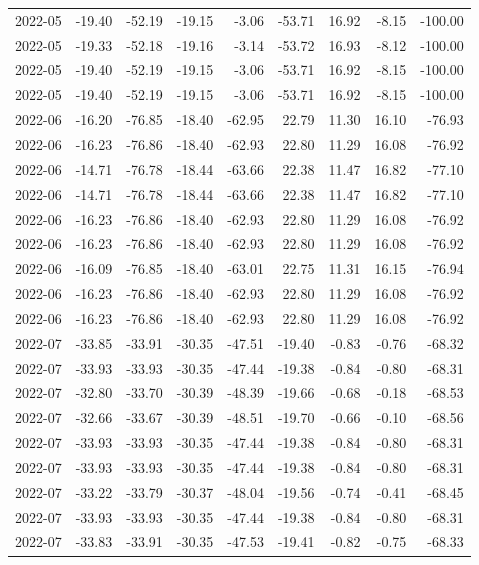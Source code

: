 \begin{table}[ht]
\begin{tabular}{lrrrrrrrr}
  2022-05 & -19.40 & -52.19 & -19.15 & -3.06 & -53.71 & 16.92 & -8.15 & -100.00 \\ 
  2022-05 & -19.33 & -52.18 & -19.16 & -3.14 & -53.72 & 16.93 & -8.12 & -100.00 \\ 
  2022-05 & -19.40 & -52.19 & -19.15 & -3.06 & -53.71 & 16.92 & -8.15 & -100.00 \\ 
  2022-05 & -19.40 & -52.19 & -19.15 & -3.06 & -53.71 & 16.92 & -8.15 & -100.00 \\ 
  2022-06 & -16.20 & -76.85 & -18.40 & -62.95 & 22.79 & 11.30 & 16.10 & -76.93 \\ 
  2022-06 & -16.23 & -76.86 & -18.40 & -62.93 & 22.80 & 11.29 & 16.08 & -76.92 \\ 
  2022-06 & -14.71 & -76.78 & -18.44 & -63.66 & 22.38 & 11.47 & 16.82 & -77.10 \\ 
  2022-06 & -14.71 & -76.78 & -18.44 & -63.66 & 22.38 & 11.47 & 16.82 & -77.10 \\ 
  2022-06 & -16.23 & -76.86 & -18.40 & -62.93 & 22.80 & 11.29 & 16.08 & -76.92 \\ 
  2022-06 & -16.23 & -76.86 & -18.40 & -62.93 & 22.80 & 11.29 & 16.08 & -76.92 \\ 
  2022-06 & -16.09 & -76.85 & -18.40 & -63.01 & 22.75 & 11.31 & 16.15 & -76.94 \\ 
  2022-06 & -16.23 & -76.86 & -18.40 & -62.93 & 22.80 & 11.29 & 16.08 & -76.92 \\ 
  2022-06 & -16.23 & -76.86 & -18.40 & -62.93 & 22.80 & 11.29 & 16.08 & -76.92 \\ 
  2022-07 & -33.85 & -33.91 & -30.35 & -47.51 & -19.40 & -0.83 & -0.76 & -68.32 \\ 
  2022-07 & -33.93 & -33.93 & -30.35 & -47.44 & -19.38 & -0.84 & -0.80 & -68.31 \\ 
  2022-07 & -32.80 & -33.70 & -30.39 & -48.39 & -19.66 & -0.68 & -0.18 & -68.53 \\ 
  2022-07 & -32.66 & -33.67 & -30.39 & -48.51 & -19.70 & -0.66 & -0.10 & -68.56 \\ 
  2022-07 & -33.93 & -33.93 & -30.35 & -47.44 & -19.38 & -0.84 & -0.80 & -68.31 \\ 
  2022-07 & -33.93 & -33.93 & -30.35 & -47.44 & -19.38 & -0.84 & -0.80 & -68.31 \\ 
  2022-07 & -33.22 & -33.79 & -30.37 & -48.04 & -19.56 & -0.74 & -0.41 & -68.45 \\ 
  2022-07 & -33.93 & -33.93 & -30.35 & -47.44 & -19.38 & -0.84 & -0.80 & -68.31 \\ 
  2022-07 & -33.83 & -33.91 & -30.35 & -47.53 & -19.41 & -0.82 & -0.75 & -68.33 \\ 

\end{tabular}
\end{table}
